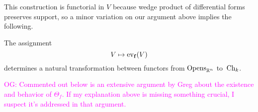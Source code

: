 \documentclass[11pt]{amsart}
\numberwithin{equation}{section}
\def\owen{\textcolor{magenta}{OG: }\textcolor{magenta}}
\def\greg{\textcolor{red}{GG: }\textcolor{red}}
\begin{document}
This construction is functorial in $V$ because wedge product of differential forms preserves support,
so a minor variation on our argument above implies the following.

\begin{lmm}
The assignment
\[
V \mapsto {\rm ev}_{{\bf f}}(V)
\]
determines a natural transformation between functors from ${\rm Opens}_{\mathbb R^n}$ to~${\rm Ch}_k$.
\end{lmm}

\owen{Commented out below is an extensive argument by Greg about the existence and behavior of $\Theta_f$. If my explanation above is missing something crucial, I suspect it's addressed in that argument.}

\end{document}
